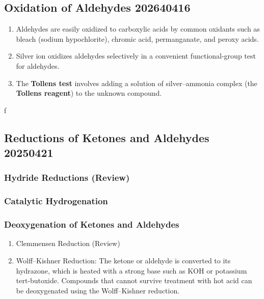 \subsection{Oxidation of Aldehydes 202640416}

\begin{enumerate}
    \item Aldehydes are easily oxidized to carboxylic acids by common oxidants such as bleach (sodium hypochlorite), chromic acid, permanganate, and peroxy acids.
    \item Silver ion oxidizes aldehydes selectively in a convenient functional-group test for aldehydes.
    \item The \textbf{Tollens test} involves adding a solution of silver–ammonia complex (the \textbf{Tollens reagent}) to the unknown compound.
\end{enumerate}

\begin{example} %
    f 
\end{example}

\subsection{Reductions of Ketones and Aldehydes 20250421}

\subsubsection{Hydride Reductions (Review)}

\subsubsection{Catalytic Hydrogenation}

\subsubsection{Deoxygenation of Ketones and Aldehydes}

\begin{enumerate}
    \item Clemmensen Reduction (Review)
    \item Wolff–Kishner Reduction: The ketone or aldehyde is converted to its hydrazone, which is heated with a strong base such as KOH or potassium tert-butoxide. Compounds that cannot survive treatment with hot acid can be deoxygenated using the Wolff–Kishner reduction.
\end{enumerate}

